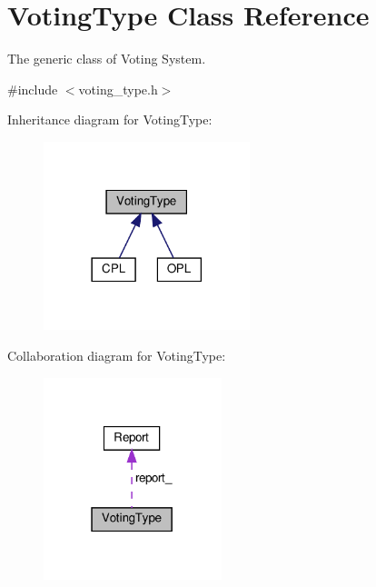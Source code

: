 \hypertarget{classVotingType}{}\section{Voting\+Type Class Reference}
\label{classVotingType}


The generic class of Voting System.  




{\ttfamily \#include $<$voting\+\_\+type.\+h$>$}



Inheritance diagram for Voting\+Type\+:
\nopagebreak
\begin{figure}[H]
\begin{center}
\leavevmode
\includegraphics[width=170pt]{classVotingType__inherit__graph}
\end{center}
\end{figure}


Collaboration diagram for Voting\+Type\+:
\nopagebreak
\begin{figure}[H]
\begin{center}
\leavevmode
\includegraphics[width=147pt]{classVotingType__coll__graph}
\end{center}
\end{figure}
